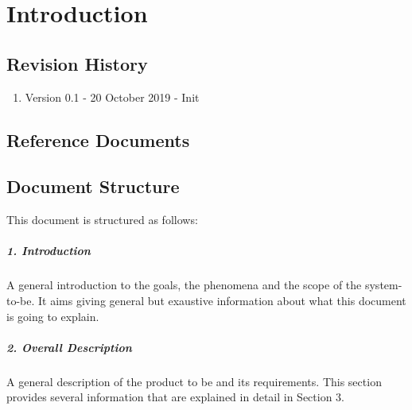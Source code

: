 \documentclass[../rasd.tex]{subfiles}
\begin{document}
\chapter{Introduction}
\thispagestyle{fancy}
		
		
		
		
		
	
		\section{Revision History}
		\begin{enumerate}
			\item Version 0.1 - 20 October 2019 - Init

		\end{enumerate}
		\section{Reference Documents}
		\section{Document Structure}
		This document is structured as follows:
		\paragraph{1. Introduction}
		A general introduction to the goals, the phenomena and the scope of the system-to-be. It aims giving general but exaustive information about what this document is going to explain.
		\paragraph{2. Overall Description}
		A general description of the product to be and its requirements. This section provides several information that are explained in detail in Section 3.
\end{document}
